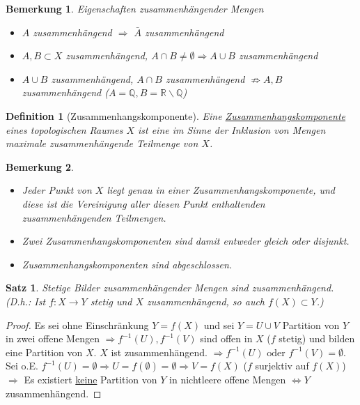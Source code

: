 \documentclass[a4paper,11pt,notitlepage]{report}
\newtheorem{definition}{Definition}[chapter]
\newtheorem{theorem}{Satz}[chapter]
\newtheorem{remark}{Bemerkung}[chapter]
\newcommand{\R}{{\ensuremath{\mathbb{R}}}}
\newcommand{\Q}{{\ensuremath{\mathbb{Q}}}}
\begin{document}
\begin{remark}{Eigenschaften zusammenhängender Mengen}
	\begin{itemize}
		\item $A$ zusammenhängend $\Rightarrow$ $\bar{A}$ zusammenhängend
		\item $A,B \subset X$ zusammenhängend, $A \cap B \neq \emptyset \Rightarrow A \cup B$ zusammenhängend
		\item $A \cup B$ zusammenhängend, $A \cap B$ zusammenhängend $\not\Rightarrow A,B$ zusammenhängend ($A = \Q, B = \R \backslash \Q$)
	\end{itemize}
\end{remark}

\begin{definition}[Zusammenhangskomponente]
	Eine \underline{Zusammenhangskomponente} eines topologischen Raumes $X$ ist eine im Sinne der Inklusion von Mengen maximale zusammenhängende Teilmenge von $X$.
\end{definition}

\begin{remark}{}
	\begin{itemize}
		\item Jeder Punkt von $X$ liegt genau in einer Zusammenhangskomponente, und diese ist die Vereinigung aller diesen Punkt enthaltenden zusammenhängenden Teilmengen.
		\item Zwei Zusammenhangskomponenten sind damit entweder gleich oder disjunkt.
		\item Zusammenhangskomponenten sind abgeschlossen.
	\end{itemize}
\end{remark}

\begin{theorem}
	Stetige Bilder zusammenhängender Mengen sind zusammenhängend.
	\newline
	(D.h.: Ist $f \colon X \rightarrow Y$ stetig und $X$ zusammenhängend, so auch $f(X)\subset Y$.)
\end{theorem}

\begin{proof}
	Es sei ohne Einschränkung $Y=f(X)$ und sei $Y=U \cup V$ Partition von $Y$ in zwei offene Mengen $\Rightarrow f^{-1}(U), f^{-1}(V)$ sind offen in $X$ ($f$ stetig) und bilden eine Partition von $X$. $X$ ist zusammenhängend.
	$\Rightarrow f^{-1}(U) \text{ oder } f^{-1}(V) = \emptyset$.
	\newline
	Sei o.E. $f^{-1}(U) = \emptyset \Rightarrow U = f(\emptyset) = \emptyset \Rightarrow V = f(X)$ ($f$ surjektiv auf $f(X)$)
	\newline
	$\Rightarrow$ Es existiert \underline{keine} Partition von $Y$ in nichtleere offene Mengen $\Leftrightarrow Y$ zusammenhängend.
\end{proof}
\end{document}

